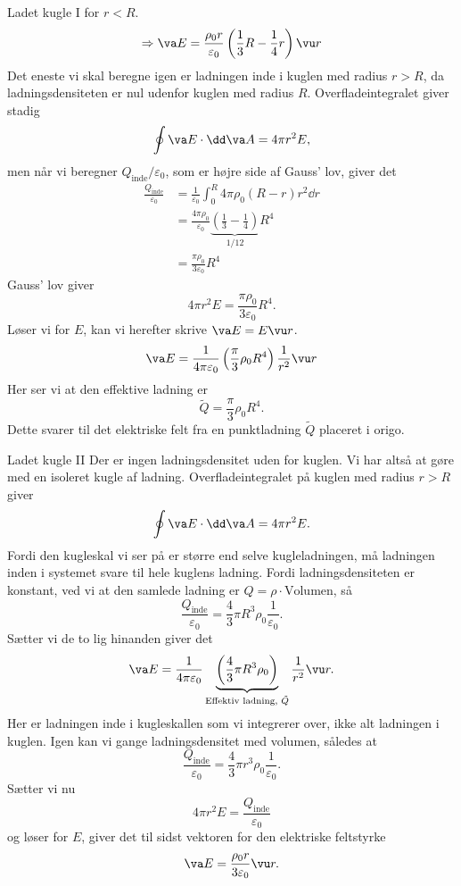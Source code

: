 \begin{opgave}{Ladet kugle I}
    for $r<R$.
    \[ \Rightarrow \va E=\frac{\rho_0 r}{\varepsilon_0}\left(\frac{1}{3}R-\frac{1}{4}r\right)\vu r \]
    \opg Det eneste vi skal beregne igen er ladningen inde i kuglen med radius $r>R$, da ladningsdensiteten er nul udenfor kuglen med radius $R$. Overfladeintegralet giver stadig
    \[ \oint \va E\cdot \dd\va A=4\pi r^2E, \]
    men når vi beregner $Q_\text{inde}/\varepsilon_0$, som er højre side af Gauss' lov, giver det
    \begin{align*}
        \frac{Q_\text{inde}}{\varepsilon_0}&=\frac{1}{\varepsilon_0}\int_0^R 4\pi\rho_0(R-r)r^2\dd r\\
        &=\frac{4\pi\rho_0}{\varepsilon_0}\underbrace{\left(\frac{1}{3}-\frac{1}{4}\right)}_{\text{$1/12$}}R^4\\
        &=\frac{\pi\rho_0}{3\varepsilon_0}R^4
    \end{align*}
    Gauss' lov giver
    \[ 4\pi r^2E=\frac{\pi\rho_0}{3\varepsilon_0}R^4. \]
    Løser vi for $E$, kan vi herefter skrive $\va E=E\vu r$.
    \[ \va E=\frac{1}{4\pi\varepsilon_0}\left(\frac{\pi}{3}\rho_0R^4\right)\frac{1}{r^2}\vu r \]
    Her ser vi at den effektive ladning er
    \[ \widetilde{Q}=\frac{\pi}{3}\rho_0R^4. \]
    \opg Dette svarer til det elektriske felt fra en punktladning $\widetilde{Q}$ placeret i origo.
\end{opgave}

\begin{opgave}{Ladet kugle II}
    \opg Der er ingen ladningsdensitet uden for kuglen. Vi har altså at gøre med en isoleret kugle af ladning.
    \opg Overfladeintegralet på kuglen med radius $r>R$ giver
    \[ \oint\va E\cdot \dd\va A=4\pi r^2E. \]
    Fordi den kugleskal vi ser på er større end selve kugleladningen, må ladningen inden i systemet svare til hele kuglens ladning. Fordi ladningsdensiteten er konstant, ved vi at den samlede ladning er $Q=\rho\cdot\text{Volumen}$, så
    \[ \frac{Q_\text{inde}}{\varepsilon_0}=\frac{4}{3}\pi R^3\rho_0\frac{1}{\varepsilon_0}. \]
    Sætter vi de to lig hinanden giver det
    \[ \va E=\frac{1}{4\pi\varepsilon_0}\underbrace{\left(\frac{4}{3}\pi R^3\rho_0\right)}_{\text{Effektiv ladning, $\tilde{Q}$}}\frac{1}{r^2}\vu r. \]
    \opg Her er ladningen inde i kugleskallen som vi integrerer over, ikke alt ladningen i kuglen. Igen kan vi gange ladningsdensitet med volumen, således at 
    \[ \frac{Q_\text{inde}}{\varepsilon_0}=\frac{4}{3}\pi r^3\rho_0\frac{1}{\varepsilon_0}. \]
    Sætter vi nu
    \[ 4\pi r^2E=\frac{Q_\text{inde}}{\varepsilon_0} \]
    og løser for $E$, giver det til sidst vektoren for den elektriske feltstyrke
    \[ \va E=\frac{\rho_0 r}{3\varepsilon_0}\vu r. \]
\end{opgave}


